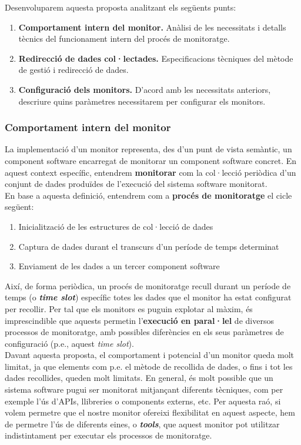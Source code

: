 Desenvoluparem aquesta proposta analitzant els següents punts:

\begin{enumerate}
\item \textbf{Comportament intern del monitor.} Anàlisi de les necessitats i detalls tècnics del funcionament intern del procés de monitoratge.
\item \textbf{Redirecció de dades col·lectades.} Especificacions tècniques del mètode de gestió i redirecció de dades.
\item \textbf{Configuració dels monitors.} D'acord amb les necessitats anteriors, descriure quins paràmetres necessitarem per configurar els monitors.
\end{enumerate}

\subsubsection{Comportament intern del monitor}

La implementació d'un monitor representa, des d'un punt de vista semàntic, un component software encarregat de monitorar un component software concret. En aquest context específic, entendrem \textbf{monitorar} com la col·lecció periòdica d'un conjunt de dades produïdes de l'execució del sistema software monitorat.\\

En base a aquesta definició, entendrem com a \textbf{procés de monitoratge} el cicle següent:

\begin{enumerate}
\item Inicialització de les estructures de col·lecció de dades
\item Captura de dades durant el transcurs d'un període de temps determinat
\item Enviament de les dades a un tercer component software
\end{enumerate}

Així, de forma periòdica, un procés de monitoratge recull durant un període de temps (o \textbf{\textit{time slot}}) específic totes les dades que el monitor ha estat configurat per recollir. Per tal que els monitors es puguin explotar al màxim, és imprescindible que aquests permetin l'\textbf{execució en paral·lel} de diversos processos de monitoratge, amb possibles diferències en els seus paràmetres de configuració (p.e., aquest \textit{time slot}).\\

Davant aquesta proposta, el comportament i potencial d'un monitor queda molt limitat, ja que elements com p.e. el mètode de recollida de dades, o fins i tot les dades recollides, queden molt limitats. En general, és molt possible que un sistema software pugui ser monitorat mitjançant diferents tècniques, com per exemple l'ús d'APIs, llibreries o components externs, etc. Per aquesta raó, si volem permetre que el nostre monitor ofereixi flexibilitat en aquest aspecte, hem de permetre l'ús de diferents eines, o \textbf{\textit{tools}}, que aquest monitor pot utilitzar indistintament per executar els processos de monitoratge.\\

